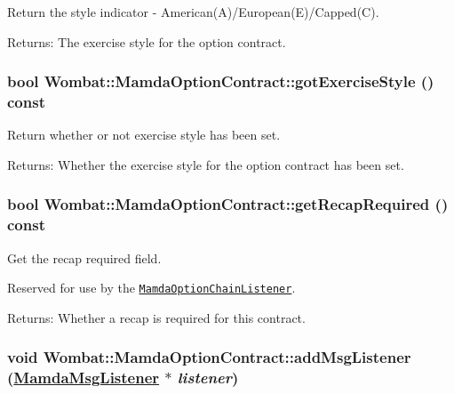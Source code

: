 Return the style indicator - American(A)/European(E)/Capped(C). 

\begin{Desc}
\item[Returns:]The exercise style for the option contract. \end{Desc}
\hypertarget{classWombat_1_1MamdaOptionContract_1748619372a2553ccb58cc2f6bc1afd4}{
\subsubsection[gotExerciseStyle]{\setlength{\rightskip}{0pt plus 5cm}bool Wombat::Mamda\-Option\-Contract::got\-Exercise\-Style () const}}
\label{classWombat_1_1MamdaOptionContract_1748619372a2553ccb58cc2f6bc1afd4}


Return whether or not exercise style has been set. 

\begin{Desc}
\item[Returns:]Whether the exercise style for the option contract has been set. \end{Desc}
\hypertarget{classWombat_1_1MamdaOptionContract_9f56471e4fca1f924e2401ddaf257f3c}{
\subsubsection[getRecapRequired]{\setlength{\rightskip}{0pt plus 5cm}bool Wombat::Mamda\-Option\-Contract::get\-Recap\-Required () const}}
\label{classWombat_1_1MamdaOptionContract_9f56471e4fca1f924e2401ddaf257f3c}


Get the recap required field. 

Reserved for use by the {\tt \hyperlink{classWombat_1_1MamdaOptionChainListener}{Mamda\-Option\-Chain\-Listener}}.

\begin{Desc}
\item[Returns:]Whether a recap is required for this contract. \end{Desc}
\hypertarget{classWombat_1_1MamdaOptionContract_722a517c5fefa5847e3c4ea8a867d06a}{
\subsubsection[addMsgListener]{\setlength{\rightskip}{0pt plus 5cm}void Wombat::Mamda\-Option\-Contract::add\-Msg\-Listener (\hyperlink{classWombat_1_1MamdaMsgListener}{Mamda\-Msg\-Listener} $\ast$ {\em listener})}}
\label{classWombat_1_1MamdaOptionContract_722a517c5fefa5847e3c4ea8a867d06a}


